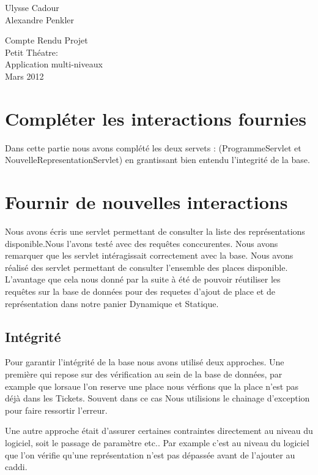 \documentclass[12pt]{article}
\begin{document}
\noindent Ulysse Cadour \\
Alexandre Penkler\\


\begin{center}
  {\large  Compte Rendu Projet \\
    Petit Théatre:\\
    Application multi-niveaux
    } \\ %
  Mars 2012\\
\end{center}
\newpage



\section{ Compléter les interactions fournies}
Dans cette partie nous avons complété les deux servets : (ProgrammeServlet et NouvelleRepresentationServlet) en grantissant bien entendu l'integrité de la base.

 


\section{ Fournir de nouvelles interactions}

Nous avons écris une servlet permettant de consulter la liste des représentations disponible.Nous l'avons testé avec des requêtes conccurentes. Nous avons remarquer que les servlet intéragissait correctement avec la base.
Nous avons réalisé des servlet permettant de consulter l'ensemble des places disponible. L'avantage que cela nous donné par la suite à été de pouvoir réutiliser les requêtes sur la base de données pour des requetes d'ajout de place et de représentation dans notre panier Dynamique et Statique.


\subsection{Intégrité}
Pour garantir l'intégrité de la base nous avons utilisé deux approches. Une première qui repose sur des vérification au sein de la base de données, par example que lorsaue l'on reserve une place nous vérfions que la place n'est pas déjà dans les Tickets. Souvent dans ce cas Nous utilisions le chainage d'exception pour faire ressortir l'erreur.


Une autre approche était d'assurer certaines contraintes directement au niveau du logiciel, soit le passage de paramètre etc.. Par example c'est au niveau du logiciel que l'on vérifie qu'une représentation n'est pas dépassée avant de l'ajouter au caddi.
\end{document}
